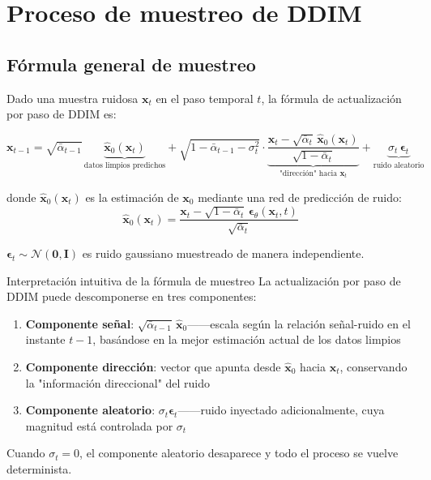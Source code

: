 \section{Proceso de muestreo de DDIM}

\subsection{Fórmula general de muestreo}

Dado una muestra ruidosa $\mathbf{x}_t$ en el paso temporal $t$, la fórmula de actualización por paso de DDIM es:

$$
\mathbf{x}_{t-1} = \sqrt{\bar{\alpha}_{t-1}}\,\underbrace{\hat{\mathbf{x}}_0(\mathbf{x}_t)}_{\text{datos limpios predichos}} + \sqrt{1-\bar{\alpha}_{t-1}-\sigma_t^2}\cdot\underbrace{\frac{\mathbf{x}_t - \sqrt{\bar{\alpha}_t}\,\hat{\mathbf{x}}_0(\mathbf{x}_t)}{\sqrt{1-\bar{\alpha}_t}}}_{\text{"dirección" hacia } \mathbf{x}_t} + \underbrace{\sigma_t\,\boldsymbol{\epsilon}_t}_{\text{ruido aleatorio}}
$$

donde $\hat{\mathbf{x}}_0(\mathbf{x}_t)$ es la estimación de $\mathbf{x}_0$ mediante una red de predicción de ruido:
$$
\hat{\mathbf{x}}_0(\mathbf{x}_t) = \frac{\mathbf{x}_t - \sqrt{1-\bar{\alpha}_t}\,\boldsymbol{\epsilon}_\theta(\mathbf{x}_t, t)}{\sqrt{\bar{\alpha}_t}}
$$

$\boldsymbol{\epsilon}_t \sim \mathcal{N}(\mathbf{0}, \mathbf{I})$ es ruido gaussiano muestreado de manera independiente.

\begin{importantbox}{Interpretación intuitiva de la fórmula de muestreo}
La actualización por paso de DDIM puede descomponerse en tres componentes:
\begin{enumerate}
    \item \textbf{Componente señal}: $\sqrt{\bar{\alpha}_{t-1}}\,\hat{\mathbf{x}}_0$——escala según la relación señal-ruido en el instante $t-1$, basándose en la mejor estimación actual de los datos limpios
    \item \textbf{Componente dirección}: vector que apunta desde $\hat{\mathbf{x}}_0$ hacia $\mathbf{x}_t$, conservando la "información direccional" del ruido
    \item \textbf{Componente aleatorio}: $\sigma_t \boldsymbol{\epsilon}_t$——ruido inyectado adicionalmente, cuya magnitud está controlada por $\sigma_t$
\end{enumerate}
Cuando $\sigma_t=0$, el componente aleatorio desaparece y todo el proceso se vuelve determinista.
\end{importantbox}


